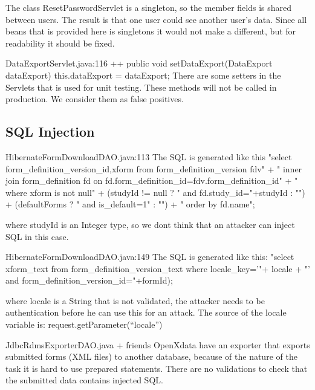 \documentclass[11pt,a4paper]{article}
\theoremstyle{definition}
\begin{document}
The class ResetPasswordServlet is a singleton, so the member fields is shared between users.
The result is that one user could see another user's data.
Since all beans that is provided here is singletons it would not make a different, but for readability it should be fixed.


DataExportServlet.java:116 ++
public void setDataExport(DataExport dataExport) {
    this.dataExport = dataExport;
}
There are some setters in the Servlets that is used for unit testing. These methods will not be called in production.
We consider them as false positives.

\subsection{SQL Injection}
HibernateFormDownloadDAO.java:113
The SQL is generated like this
"select form_definition_version_id,xform from form_definition_version fdv" +
    " inner join form_definition fd on fd.form_definition_id=fdv.form_definition_id" +
    " where xform is not null" + (studyId != null ? " and fd.study_id="+studyId : "") +
    (defaultForms ? " and is_default=1" : "") + " order by fd.name";

where studyId is an Integer type, so we dont think that an attacker can inject SQL in this case.


HibernateFormDownloadDAO.java:149
The SQL is generated like this:
"select xform_text from form_definition_version_text where locale_key='"+ locale + "' and form_definition_version_id="+formId);

where locale is a String that is not validated, the attacker needs to be authentication before he can use this for an attack.
The source of the locale variable is: request.getParameter(``locale'')


JdbcRdmsExporterDAO.java + friends
OpenXdata have an exporter that exports submitted forms (XML files) to another database, because of the nature of the task it is hard to use prepared statements.
There are no validations to check that the submitted data contains injected SQL.
\end{document}
